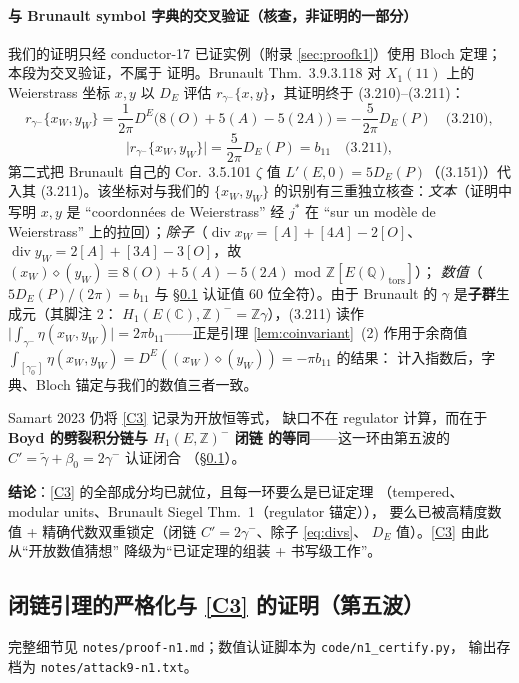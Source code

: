 \documentclass[11pt,a4paper]{ctexart}
\theoremstyle{remark}
\newcommand{\diver}{\mathop{\mathrm{div}}}
\newcommand{\QQ}{\mathbb{Q}}
\newcommand{\ZZ}{\mathbb{Z}}
\newcommand{\CC}{\mathbb{C}}
\newcommand{\bN}{b_{11}}
\begin{document}
\paragraph{与 Brunault symbol 字典的交叉验证（核查，非证明的一部分）}我们的证明只经
conductor-17 已证实例（附录 \ref{sec:proofk1}）使用 Bloch 定理；本段为交叉验证，不属于
证明。Brunault Thm.~3.9.3.118 对 $X_1(11)$ 上的 Weierstrass 坐标 $x,y$ 以 $D_E$ 评估
$r_{\gamma^-}\{x,y\}$，其证明终于 (3.210)--(3.211)：
\[
r_{\gamma^-}\{x_W,y_W\}=\frac1{2\pi}D^E\big(8(O)+5(A)-5(2A)\big)
=-\frac{5}{2\pi}D_E(P)\quad\text{(3.210)},
\]
\[
\big|r_{\gamma^-}\{x_W,y_W\}\big|=\frac{5}{2\pi}D_E(P)=\bN\quad\text{(3.211)},
\]
第二式把 Brunault 自己的 Cor.~3.5.101 $\zeta$ 值 $L'(E,0)=5D_E(P)$（(3.151)）代入其
(3.211)。该坐标对与我们的 $\{x_W,y_W\}$ 的识别有三重独立核查：\emph{文本}（证明中写明
$x,y$ 是 ``coordonn\'ees de Weierstrass'' 经 $j^*$ 在 ``sur un mod\`ele de Weierstrass''
上的拉回）；\emph{除子}（$\diver x_W=[A]+[4A]-2[O]$、$\diver y_W=2[A]+[3A]-3[O]$，故
$(x_W)\diamond(y_W)\equiv8(O)+5(A)-5(2A)$ mod $\ZZ[E(\QQ)_{\mathrm{tors}}]$）；
\emph{数值}（$5D_E(P)/(2\pi)=\bN$ 与 \S\ref{sec:proofc3} 认证值 60 位全符）。由于
Brunault 的 $\gamma$ 是\textbf{子群}生成元（其脚注 2：
$H_1(E(\CC),\ZZ)^-=\ZZ\gamma$），(3.211) 读作
$\big|\int_{\gamma^-}\eta(x_W,y_W)\big|=2\pi\bN$——正是引理 \ref{lem:coinvariant}~(2)
作用于余商值 $\int_{[\gamma^-_0]}\eta(x_W,y_W)=D^E((x_W)\diamond(y_W))=-\pi\bN$ 的结果：
计入指数后，字典、Bloch 锚定与我们的数值三者一致。

Samart 2023 仍将 \eqref{C3} 记录为开放恒等式，
缺口不在 regulator 计算，而在于 \textbf{Boyd 的劈裂积分链与 $H_1(E,\ZZ)^-$ 闭链
的等同}——这一环由第五波的 $C'=\tilde\gamma+\beta_0=2\gamma^-$ 认证闭合
（\S\ref{sec:proofc3}）。

\textbf{结论}：\eqref{C3} 的全部成分均已就位，且每一环要么是已证定理
（tempered、modular units、Brunault Siegel Thm.~1（regulator 锚定）），
要么已被高精度数值 + 精确代数双重锁定（闭链 $C'=2\gamma^-$、除子 \eqref{eq:divs}、
$D_E$ 值）。\eqref{C3} 由此从``开放数值猜想''
降级为``已证定理的组装 + 书写级工作''。

\subsection{闭链引理的严格化与 \eqref{C3} 的证明（第五波）}\label{sec:proofc3}

完整细节见 \texttt{notes/proof-n1.md}；数值认证脚本为 \texttt{code/n1\_certify.py}，
输出存档为 \texttt{notes/attack9-n1.txt}。
\end{document}
